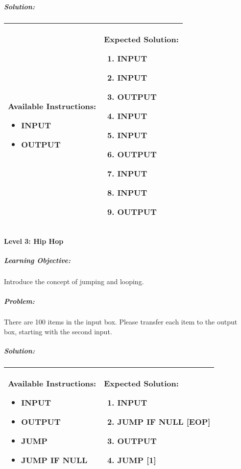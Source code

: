 \subparagraph{Solution:} 
\begin{center}
    \begin{tabular}{ | m{5cm} | m{9cm} | } 
        \hline
            \textbf{Available Instructions:} 
            \begin{itemize}
                \item INPUT
                \item OUTPUT
            \end{itemize}& 
            \textbf{Expected Solution:} 
            \begin{enumerate}
                \item INPUT
                \item INPUT
                \item OUTPUT
                \item INPUT
                \item INPUT
                \item OUTPUT
                \item INPUT
                \item INPUT
                \item OUTPUT
            \end{enumerate}
            \\
        \hline
    \end{tabular}
\end{center}

\paragraph{Level 3: Hip Hop}
\subparagraph{Learning Objective:} Introduce the concept of jumping and looping.

\subparagraph{Problem:} There are 100 items in the input box. Please transfer each item to the output box, starting with the second input.

\subparagraph{Solution:} 
\begin{center}
    \begin{tabular}{ | m{5cm} | m{9cm} | } 
        \hline
            \textbf{Available Instructions:} 
            \begin{itemize}
                \item INPUT
                \item OUTPUT
                \item JUMP
                \item JUMP IF NULL
            \end{itemize}& 
            \textbf{Expected Solution:} 
            \begin{enumerate}
                \item INPUT
                \item JUMP IF NULL [EOP]
                \item OUTPUT
                \item JUMP [1]
            \end{enumerate}
            \\
        \hline
    \end{tabular}
\end{center}